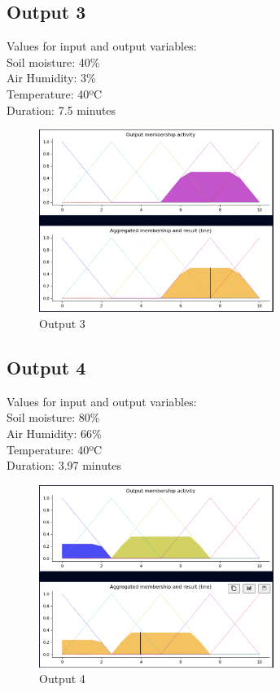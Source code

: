 \documentclass[conference]{IEEEtran}
\begin{document}
\subsection{Output 3}
Values for input and output variables: \\
Soil moisture: 40\% \\
Air Humidity: 3\% \\
Temperature: 40ºC \\
Duration: 7.5 minutes 
\begin{figure}[!ht]
    \centering
     \includegraphics[width=3in]{graphs/40_3_40.png}
    \caption{Output 3} 
\end{figure}

\subsection{Output 4}
Values for input and output variables: \\
Soil moisture: 80\% \\
Air Humidity: 66\% \\
Temperature: 40ºC \\
Duration: 3.97  minutes 
\begin{figure}[!ht]
    \centering
     \includegraphics[width=3in]{graphs/80_66_40.png}
     \caption{Output 4} 
\end{figure}
\end{document}
